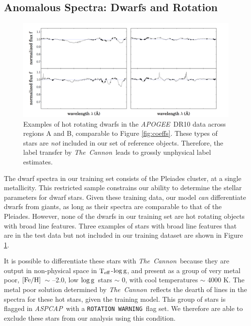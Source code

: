 \documentclass[12pt, preprint]{aastex}
\newcommand{\teff}{\mbox{$\rm T_{eff}$}}
\newcommand{\feh}{\mbox{$\rm [Fe/H]$}}
\newcommand{\logg}{\mbox{$\rm \log g$}}
\newcommand{\tc}{\textsl{The~Cannon}}
\newcommand{\apogee}{\textsl{APOGEE}}
\newcommand{\aspcap}{\textsl{ASPCAP}}
\newcommand{\rotwarn}{\texttt{ROTATION WARNING}}
\begin{document}
\subsection{Anomalous Spectra: Dwarfs and Rotation}

  \begin{figure}[!h]
   \centering
 \includegraphics[width=\hsize]{./plots/2dwarfs.png}
  \caption{Examples of hot rotating dwarfs in the \apogee\ DR10 data across regions A and B, comparable to Figure \ref{fig:coeffs}. These types of stars are \textit{not} included in our set of reference objects. Therefore, the label transfer by \tc\ leads to grossly unphysical label estimates.}
\label{fig:dwarfs}
\end{figure}


The dwarf spectra in our training set consists of the Pleiades cluster, at a single metallicity. This restricted sample constrains our ability to determine the stellar parameters for dwarf stars. Given these training data, our model \textit{can} differentiate dwarfs from giants, as long as their spectra are comparable to that of the Pleiades. However, none of the dwarfs in our training set are hot rotating objects with broad line features. Three examples of stars with broad line features that are in the test data but not included in our training dataset are shown in Figure \ref{fig:dwarfs}.

It is possible to differentiate these stars with \tc\ because they are output in non-physical space in \teff-\logg, and present as a group of very metal poor, \feh\ $\sim$ --2.0, low \logg\ stars $\sim$ 0, with cool temperatures $\sim$ 4000 K. The metal poor solution determined by \tc\ reflects the dearth of lines in the spectra for these hot stars, given the training model. This group of stars is flagged in \aspcap\ with a \rotwarn\ flag set. We therefore are able to exclude these stars from our analysis using this condition. 
 
\end{document}
